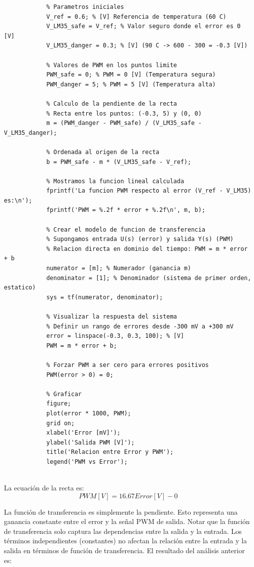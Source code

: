 \documentclass[12pt]{article}
\begin{document}
		\begin{lstlisting}
			% Parametros iniciales
			V_ref = 0.6; % [V] Referencia de temperatura (60 C)
			V_LM35_safe = V_ref; % Valor seguro donde el error es 0 [V]
			V_LM35_danger = 0.3; % [V] (90 C -> 600 - 300 = -0.3 [V])
			
			% Valores de PWM en los puntos limite
			PWM_safe = 0; % PWM = 0 [V] (Temperatura segura)
			PWM_danger = 5; % PWM = 5 [V] (Temperatura alta)
			
			% Calculo de la pendiente de la recta
			% Recta entre los puntos: (-0.3, 5) y (0, 0)
			m = (PWM_danger - PWM_safe) / (V_LM35_safe - V_LM35_danger);
			
			% Ordenada al origen de la recta
			b = PWM_safe - m * (V_LM35_safe - V_ref);
			
			% Mostramos la funcion lineal calculada
			fprintf('La funcion PWM respecto al error (V_ref - V_LM35) es:\n');
			fprintf('PWM = %.2f * error + %.2f\n', m, b);
			
			% Crear el modelo de funcion de transferencia
			% Supongamos entrada U(s) (error) y salida Y(s) (PWM)
			% Relacion directa en dominio del tiempo: PWM = m * error + b
			numerator = [m]; % Numerador (ganancia m)
			denominator = [1]; % Denominador (sistema de primer orden, estatico)
			sys = tf(numerator, denominator);
			
			% Visualizar la respuesta del sistema
			% Definir un rango de errores desde -300 mV a +300 mV
			error = linspace(-0.3, 0.3, 100); % [V]
			PWM = m * error + b;
			
			% Forzar PWM a ser cero para errores positivos
			PWM(error > 0) = 0;
			
			% Graficar
			figure;
			plot(error * 1000, PWM);
			grid on;
			xlabel('Error [mV]');
			ylabel('Salida PWM [V]');
			title('Relacion entre Error y PWM');
			legend('PWM vs Error');
			
		\end{lstlisting}
		La ecuación de la recta es:
		\begin{equation}
			PWM[V]=16.67Error[V]-0
		\end{equation}
		
		La función de transferencia es simplemente la pendiente. Esto representa una ganancia constante entre el error y la señal PWM de salida. Notar que la función de transferencia solo captura las dependencias entre la salida y la entrada. Los términos independientes (constantes) no afectan la relación entre la entrada y la salida en términos de función de transferencia.
		El resultado del análisis anterior es:
		
\end{document}
